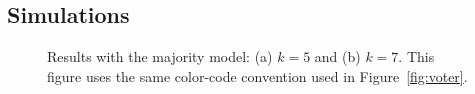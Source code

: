\documentclass[sigconf]{acmart}
\begin{document}
\subsection{Simulations}




 


\begin{figure}
  \hfill
  \caption{Results with the majority model: (a)  $k=5$ and (b) $k=7$. This figure uses the same color-code convention used in Figure~\ref{fig:voter}.}
  \label{fig:majority2}
\end{figure}
\end{document}
